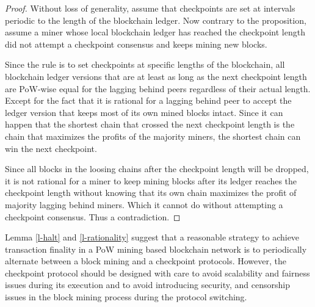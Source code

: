 \begin{proof}
Without loss of generality, assume that checkpoints are set at intervals periodic to the length of the blockchain ledger. Now contrary to the proposition, assume a miner whose local blockchain ledger has reached the checkpoint length did not attempt a checkpoint consensus and keeps mining new blocks. 

Since the rule is to set checkpoints at specific lengths of the blockchain, all blockchain ledger versions that are at least as long as the next checkpoint length are PoW-wise equal for the lagging behind peers regardless of their actual length. Except for the fact that it is rational for a lagging behind peer to accept the ledger version that keeps most of its own mined blocks intact. Since it can happen that the shortest chain that crossed the next checkpoint length is the chain that maximizes the profits of the majority miners, the shortest chain can win the next checkpoint. 

Since all blocks in the loosing chains after the checkpoint length will be dropped, it is not rational for a miner to keep mining blocks after its ledger reaches the checkpoint length without knowing that its own chain maximizes the profit of majority lagging behind miners. Which it cannot do without attempting a checkpoint consensus. Thus a contradiction. 
\end{proof}

Lemma \ref{l-halt} and \ref{l-rationality} suggest that a reasonable strategy to achieve transaction finality in a PoW mining based blockchain network is to periodically alternate between a block mining and a checkpoint protocols. However, the checkpoint protocol should be designed with care to avoid scalability and fairness issues during its execution and to avoid introducing security, and censorship issues in the block mining process during the protocol switching.     

